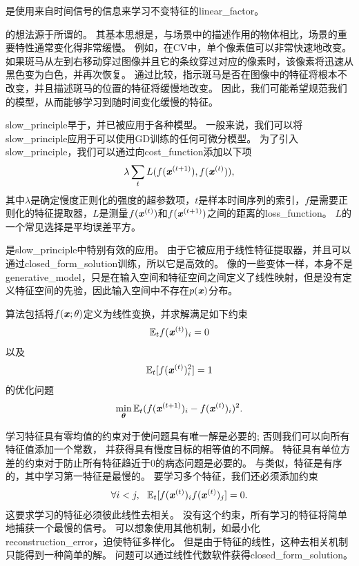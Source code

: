 是使用来自时间信号的信息来学习不变特征的\gls{linear_factor}\citep{WisSej2002}。


的想法源于所谓的。
其基本思想是，与场景中的描述作用的物体相比，场景的重要特性通常变化得非常缓慢。
例如，在\gls{CV}中，单个像素值可以非常快速地改变。
如果斑马从左到右移动穿过图像并且它的条纹穿过对应的像素时，该像素将迅速从黑色变为白色，并再次恢复。
通过比较，指示斑马是否在图像中的特征将根本不改变，并且描述斑马的位置的特征将缓慢地改变。
因此，我们可能希望规范我们的模型，从而能够学习到随时间变化缓慢的特征。


\gls{slow_principle}早于，并已被应用于各种模型\citep{Hinton89b,Foldiak89,MobahiCollobertWestonICML2009,Bergstra+Bengio-2009}。
一般来说，我们可以将\gls{slow_principle}应用于可以使用\gls{GD}训练的任何可微分模型。 
为了引入\gls{slow_principle}，我们可以通过向\gls{cost_function}添加以下项
\begin{align}
\label{eqn:137}
\lambda \sum_t L(f(\boldsymbol{\mathit{x}}^{(t+1)}),f(\boldsymbol{\mathit{x}}^{(t)})),
\end{align}
其中$\lambda$是确定慢度正则化的强度的超参数项，$t$是样本时间序列的索引，$f$是需要正则化的特征提取器，$L$是测量$f(\boldsymbol{\mathit{x}}^{(t)})$和$f(\boldsymbol{\mathit{x}}^{(t+1)})$之间的距离的\gls{loss_function}。
$L$的一个常见选择是平均误差平方。


是\gls{slow_principle}中特别有效的应用。
由于它被应用于线性特征提取器，并且可以通过\gls{closed_form_solution}训练，所以它是高效的。
像的一些变体一样，本身不是\gls{generative_model}，只是在输入空间和特征空间之间定义了线性映射，但是没有定义特征空间的先验，因此输入空间中不存在$p(\boldsymbol{\mathit{x}})$分布。


算法\citep{WisSej2002}包括将$f(\boldsymbol{\mathit{x}};\theta)$定义为线性变换，并求解满足如下约束
\begin{align}
\label{eqn:139}
\mathbb{E}_t  f(\boldsymbol{\mathit{x}}^{(t)})_i = 0 
\end{align}
以及
\begin{align}
\label{eqn:1310}
\mathbb{E}_t [ f(\boldsymbol{\mathit{x}}^{(t)})_i^2 ] =1 
\end{align}
的优化问题
\begin{align}
\label{eqn:138}
\min_{\boldsymbol{\theta}} \mathbb{E}_t  (f(\boldsymbol{\mathit{x}}^{(t+1)})_i - f(\boldsymbol{\mathit{x}}^{(t)})_i  )^2.
\end{align}


学习特征具有零均值的约束对于使问题具有唯一解是必要的; 否则我们可以向所有特征值添加一个常数，
并获得具有慢度目标的相等值的不同解。
特征具有单位方差的约束对于防止所有特征趋近于$0$的病态问题是必要的。
与类似，特征是有序的，其中学习第一特征是最慢的。
要学习多个特征，我们还必须添加约束
\begin{align}
\label{eqn:1311}
\forall i<j,\ \  \mathbb{E}_t [f(\boldsymbol{\mathit{x}}^{(t)})_i  f(\boldsymbol{\mathit{x}}^{(t)})_j] = 0.
\end{align}
这要求学习的特征必须彼此线性去相关。 
没有这个约束，所有学习的特征将简单地捕获一个最慢的信号。
可以想象使用其他机制，如最小化\gls{reconstruction_error}，迫使特征多样化。
但是由于特征的线性，这种去相关机制只能得到一种简单的解。 
问题可以通过线性代数软件获得\gls{closed_form_solution}。



